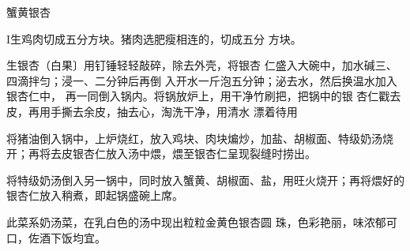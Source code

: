 \begin{recipe}{蟹黄银杏}

\ingredients



\cooking

I生鸡肉切成五分方块。猪肉选肥瘦相连的，切成五分 方块。

生银杏（白果〕用钉锤轻轻敲碎，除去外壳，将银杏 仁盛入大碗中，加水碱三、四滴拌匀；浸一、二分钟后再倒 入开水一斤泡五分钟；泌去水，然后换温水加入银杏仁中， 再一同倒入锅内。将锅放炉上，用干净竹刷把，把锅中的银 杏仁戳去皮，再用手撕去余皮，抽去心，淘洗干净，用清水 漂着待用

\step 将猪油倒入锅中，上炉烧红，放入鸡块、肉块煸炒，加盐、胡椒面、特级奶汤烧开；再将去皮银杏仁放入汤中煨，煨至银杏仁呈现裂缝时捞出。

\step 将特级奶汤倒入另一锅中，同时放入蟹黄、胡椒面、盐，用旺火烧开；再将煨好的银杏仁放入稍煮，即起锅盛碗上席。

\notes

此菜系奶汤菜，在乳白色的汤中现出粒粒金黄色银杏圆 珠，色彩艳丽，味浓郁可口，佐酒下饭均宜。

\end{recipe}

